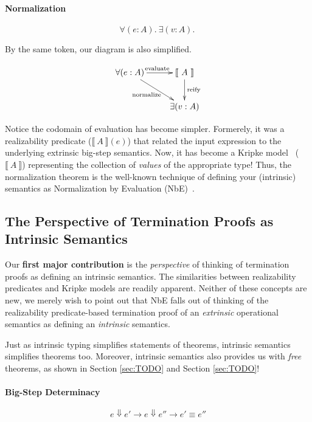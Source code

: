 \documentclass[preprint,nonatbib]{sigplanconf}
\numberwithin{subdefin}{defin}
\theoremstyle{definition}
\numberwithin{subtheorem}{theorem}
\numberwithin{sublemma}{theorem}
\numberwithin{corollary}{theorem}
\numberwithin{case}{theorem}
\numberwithin{slcase}{sublemma}
\numberwithin{scase}{subtheorem}
\numberwithin{lcase}{lemma}
\newcommand{\refsec}[1]{Section \ref{sec:#1}}
\def\bigstep{\Downarrow}
\def\marr{\rightarrow}
\newcommand{\ascribe}[2]{(#1 : #2)}
\newcommand{\all}[1]{\forall#1.~}
\newcommand{\ex}[1]{\exists#1.~}
\newcommand{\el}[1]{\llbracket ~ #1 ~ \rrbracket}
\newcommand{\fun}[1]{\textmd{#1}}
\begin{document}
\paragraph{Normalization}
$$
\all{\ascribe{e}{A}} \ex{\ascribe{v}{A}}
$$

By the same token, our diagram is also simplified.

\begin{displaymath}
    \xymatrix{
          {\forall (e : A)} 
          \ar[dr]_{\fun{normalize}}
          \ar[r]^{\fun{evaluate}}
        & {\el{A}}
          \ar[d]^{\large{\fun{reify}}}
\\      & \exists (v : A) }
\end{displaymath}

Notice the codomain of evaluation has become simpler. Formerely, it
was a realizability predicate ($\el{A}(e)$) that related the input
expression to the underlying extrinsic big-step semantics. Now, it has
become a Kripke model~\cite{TODO} ($\el{A}$) representing the
collection of {\it values} of the appropriate type! Thus, the normalization
theorem is the well-known technique of defining your (intrinsic)
semantics as Normalization by Evaluation (NbE)~\cite{TODO}.

\subsection{The Perspective of Termination Proofs as Intrinsic Semantics}

Our {\bf first major contribution} is the {\it perspective} of thinking of
termination proofs as defining an intrinsic semantics.
The similarities between realizability predicates and Kripke models are
readily apparent. Neither of these concepts are new, we merely wish
to point out that NbE falls out of thinking of the
realizability predicate-based termination proof of an {\it extrinsic}
operational semantics as defining an {\it intrinsic}
semantics.

Just as intrinsic typing simplifies statements of theorems, intrinsic semantics simplifies
theorems too. Moreover, intrinsic semantics also provides us with
{\it free} theorems, as shown in \refsec{TODO} and \refsec{TODO}!

\paragraph{Big-Step Determinacy}

$$
e \bigstep e' \marr e \bigstep e'' \marr e' \equiv e''
$$
\end{document}
